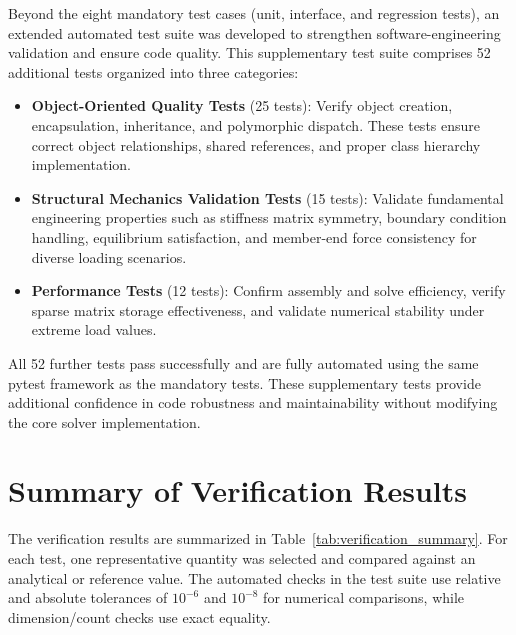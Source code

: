 Beyond the eight mandatory test cases (unit, interface, and regression tests), an extended automated test suite was developed to strengthen software-engineering validation and ensure code quality. This supplementary test suite comprises 52 additional tests organized into three categories:

\begin{itemize}
    \item \textbf{Object-Oriented Quality Tests} (25 tests): Verify object creation, encapsulation, inheritance, and polymorphic dispatch. These tests ensure correct object relationships, shared references, and proper class hierarchy implementation.
    
    \item \textbf{Structural Mechanics Validation Tests} (15 tests): Validate fundamental engineering properties such as stiffness matrix symmetry, boundary condition handling, equilibrium satisfaction, and member-end force consistency for diverse loading scenarios.
    
    \item \textbf{Performance Tests} (12 tests): Confirm assembly and solve efficiency, verify sparse matrix storage effectiveness, and validate numerical stability under extreme load values.
\end{itemize}

All 52 further tests pass successfully and are fully automated using the same pytest framework as the mandatory tests. These supplementary tests provide additional confidence in code robustness and maintainability without modifying the core solver implementation.

\section{Summary of Verification Results}

The verification results are summarized in Table~\ref{tab:verification_summary}. For each test, one representative quantity was selected and compared against an analytical or reference value. The automated checks in the test suite use relative and absolute tolerances of $10^{-6}$ and $10^{-8}$ for numerical comparisons, while dimension/count checks use exact equality.

